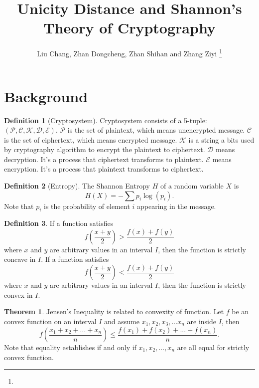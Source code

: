 \documentclass[letterpaper, 10 pt, conference]{ieeeconf}  %
\title{\LARGE \bf
Unicity Distance and Shannon's Theory of Cryptography
}
\author{Liu Chang, Zhan Dongcheng, Zhan Shihan and Zhang Ziyi%
\thanks{}%
}
\theoremstyle{definition}
\newtheorem{definition}{Definition}[section]
\theoremstyle{property}
\newtheorem{theorem}{Theorem}
\begin{document}
\maketitle
\thispagestyle{empty}
\pagestyle{empty}




\section{Background}




\begin{definition}[Cryptosystem]
\label{def:cryptosystem}
Cryptosystem consists of a 5-tuple: $(\mathcal{P}, \mathcal{C}, \mathcal{K}, \mathcal{D}, \mathcal{E})$. 
$\mathcal{P}$ is the set of plaintext, which means unencrypted message.
$\mathcal{C}$ is the set of ciphertext, which means encrypted message.
$\mathcal{K}$ is a string a bits used by cryptography algorithm to encrypt the plaintext to ciphertext.
$\mathcal{D}$ means decryption. It's a process that ciphertext transforms to plaintext.
$\mathcal{E}$ means encryption. It's a process that plaintext transforms to ciphertext. 
\end{definition}

\begin{definition}[Entropy]
\label{def:entropy}
The Shannon Entropy $H$ of a random variable $X$ is $$H(X)=-\sum p_i \log(p_i).$$
Note that $p_i$ is the probability of element $i$ appearing in the message.

\end{definition}
\begin{definition}
\label{def:strictly concave}
If a function satisfies 
$$f\left(\frac{x+y}{2}\right)>\frac{f(x)+f(y)}{2}$$
where $x$ and $y$ are arbitrary values in an interval $I$, then the function is strictly concave in $I$.
\label{def:strictly convex}
If a function satisfies 
$$f\left(\frac{x+y}{2}\right)<\frac{f(x)+f(y)}{2}$$
where $x$ and $y$ are arbitrary values in an interval $I$, then the function is strictly convex in $I$.
\end{definition}
\begin{theorem}
\label{theorem:jensen}
Jensen's Inequality is related to convexity of function.
Let $f$ be an convex function on an interval $I$ and assume $x_1,x_2,x_3,...x_n $ are inside $I$, then
$$f\left(\frac{x_1+x_2+...+x_n}{n}\right)\le \frac{f(x_1)+f(x_2)+...+f(x_n)}{n}.$$
Note that equality establishes if and only if $x_1,x_2,...,x_n$ are all equal for strictly convex function.
\end{theorem}
\end{document}
